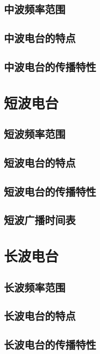 \documentclass[12pt,UTF8]{ctexbook}
\begin{document}
\subsection{中波频率范围}

\subsection{中波电台的特点}

\subsection{中波电台的传播特性}

\section{短波电台}

\subsection{短波频率范围}

\subsection{短波电台的特点}

\subsection{短波电台的传播特性}

\subsection{短波广播时间表}

\section{长波电台}

\subsection{长波频率范围}

\subsection{长波电台的特点}

\subsection{长波电台的传播特性}
\end{document}
